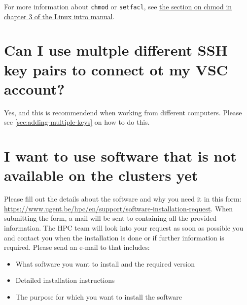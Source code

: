 For more information about \lstinline|chmod| or \lstinline|setfacl|, see \href{\LinuxManualURL#sec:chmod}
{the section on chmod in chapter 3 of the Linux intro manual}.

\section{Can I use multple different SSH key pairs to connect ot my VSC account?}

Yes, and this is recommendend when working from different computers. Please see
\autoref{sec:adding-multiple-keys} on how to do this.

\section{I want to use software that is not available on the clusters yet}
\label{sec:software-installation}

\ifgent
Please fill out the details about the software and why you need it in this form:
\url{https://www.ugent.be/hpc/en/support/software-installation-request}.
When submitting the form, a mail will be sent to \hpcinfo containing all the
provided information. The HPC team will look into your request as soon as possible
you and contact you when the installation is done or if further information is required.
\else
Please send an e-mail to \hpcinfo that includes:
\begin{itemize}
    \item What software you want to install and the required version
    \item Detailed installation instructions
    \item The purpose for which you want to install the software
\end{itemize}
\fi
